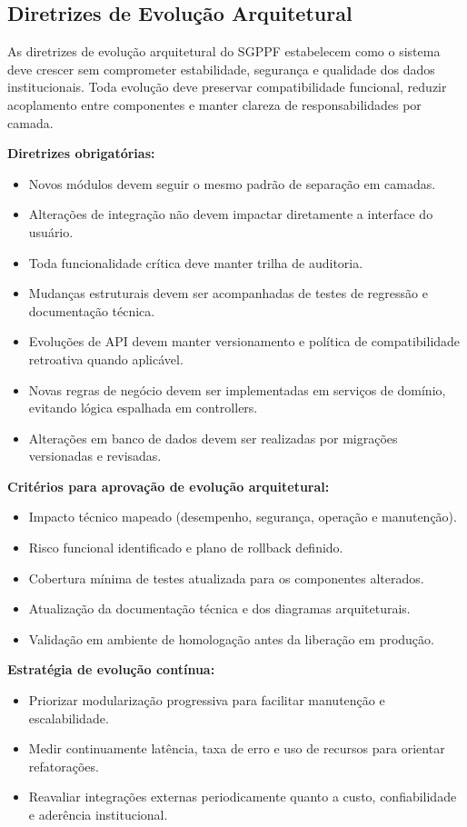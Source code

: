 \documentclass[12pt,a4paper]{article}
\begin{document}
\subsection{Diretrizes de Evolução Arquitetural}
As diretrizes de evolução arquitetural do SGPPF estabelecem como o sistema deve crescer sem comprometer estabilidade, segurança e qualidade dos dados institucionais. Toda evolução deve preservar compatibilidade funcional, reduzir acoplamento entre componentes e manter clareza de responsabilidades por camada.

\textbf{Diretrizes obrigatórias:}
\begin{itemize}[leftmargin=*]
  \item Novos módulos devem seguir o mesmo padrão de separação em camadas.
  \item Alterações de integração não devem impactar diretamente a interface do usuário.
  \item Toda funcionalidade crítica deve manter trilha de auditoria.
  \item Mudanças estruturais devem ser acompanhadas de testes de regressão e documentação técnica.
  \item Evoluções de API devem manter versionamento e política de compatibilidade retroativa quando aplicável.
  \item Novas regras de negócio devem ser implementadas em serviços de domínio, evitando lógica espalhada em controllers.
  \item Alterações em banco de dados devem ser realizadas por migrações versionadas e revisadas.
\end{itemize}

\textbf{Critérios para aprovação de evolução arquitetural:}
\begin{itemize}[leftmargin=*]
  \item Impacto técnico mapeado (desempenho, segurança, operação e manutenção).
  \item Risco funcional identificado e plano de rollback definido.
  \item Cobertura mínima de testes atualizada para os componentes alterados.
  \item Atualização da documentação técnica e dos diagramas arquiteturais.
  \item Validação em ambiente de homologação antes da liberação em produção.
\end{itemize}

\textbf{Estratégia de evolução contínua:}
\begin{itemize}[leftmargin=*]
  \item Priorizar modularização progressiva para facilitar manutenção e escalabilidade.
  \item Medir continuamente latência, taxa de erro e uso de recursos para orientar refatorações.
  \item Reavaliar integrações externas periodicamente quanto a custo, confiabilidade e aderência institucional.
\end{itemize}
\end{document}
